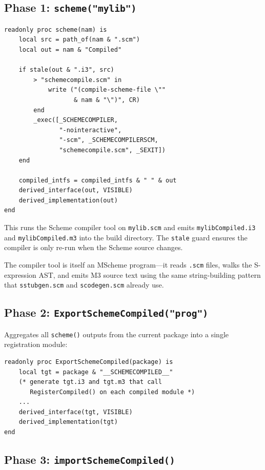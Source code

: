 \documentclass[12pt]{report}
\begin{document}
\subsection{Phase 1: \texttt{scheme("mylib")}}

\begin{lstlisting}
readonly proc scheme(nam) is
    local src = path_of(nam & ".scm")
    local out = nam & "Compiled"

    if stale(out & ".i3", src)
        > "schemecompile.scm" in
            write ("(compile-scheme-file \""
                   & nam & "\")", CR)
        end
        _exec([_SCHEMECOMPILER,
               "-nointeractive",
               "-scm", _SCHEMECOMPILERSCM,
               "schemecompile.scm", _SEXIT])
    end

    compiled_intfs = compiled_intfs & " " & out
    derived_interface(out, VISIBLE)
    derived_implementation(out)
end
\end{lstlisting}

This runs the Scheme compiler tool on \texttt{mylib.scm} and emits
\texttt{mylibCompiled.i3} and \texttt{mylibCompiled.m3} into the
build directory.  The \texttt{stale} guard ensures the compiler is
only re-run when the Scheme source changes.

The compiler tool is itself an MScheme program---it reads
\texttt{.scm} files, walks the S-expression AST, and emits M3
source text using the same string-building pattern that
\texttt{sstubgen.scm} and \texttt{scodegen.scm} already use.

\subsection{Phase 2: \texttt{ExportSchemeCompiled("prog")}}

Aggregates all \texttt{scheme()} outputs from the current package
into a single registration module:

\begin{lstlisting}
readonly proc ExportSchemeCompiled(package) is
    local tgt = package & "__SCHEMECOMPILED__"
    (* generate tgt.i3 and tgt.m3 that call
       RegisterCompiled() on each compiled module *)
    ...
    derived_interface(tgt, VISIBLE)
    derived_implementation(tgt)
end
\end{lstlisting}

\subsection{Phase 3: \texttt{importSchemeCompiled()}}
\end{document}
